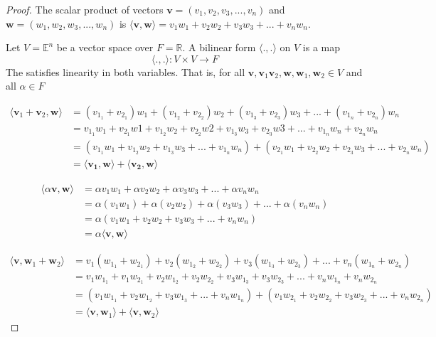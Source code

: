 \documentclass{tufte-book}
\theoremstyle{mytheoremstyle}
\theoremstyle{mylemstyle}
\theoremstyle{mydefstyle}
\begin{document}
\begin{proof}
The scalar product of vectors $\mathbf{v} = (v_1, v_2, v_3,...,v_n)$ and $\mathbf{w} = (w_1, w_2, w_3,...,w_n)$ is $\langle\mathbf{v}, \mathbf{w}\rangle = v_1w_1 + v_2w_2 + v_3w_3 +...+ v_nw_n$. 

Let $V = \mathbb{E}^n$ be a vector space over $F = \mathbb{R}$.  A bilinear form $\langle.,.\rangle$ on $V$ is a map 
\[\langle.,.\rangle : V \times V \rightarrow F \]
The satisfies linearity in both variables.  That is, for all $\mathbf{v},\mathbf{v}_1\mathbf{v}_2,\mathbf{w},\mathbf{w}_1,\mathbf{w}_2 \in V$ and all $\alpha \in F$

\begin{align*}
\langle\mathbf{v}_1+\mathbf{v}_2, \mathbf{w} \rangle &= (v_{1_{1}}+v_{2_{1}})w_1 + (v_{1_{2}}+v_{2_{2}})w_2 + (v_{1_{3}}+v_{2_{3}})w_3 +...+(v_{1_{n}}+v_{2_{n}})w_n  \\
&= v_{1_{1}}w_1 + v_{2_{1}}w1 + v_{1_{2}}w_2 + v_{2_{2}}w2 + v_{1_{3}}w_3 + v_{2_{3}}w3 +...+v_{1_{n}}w_n + v_{2_{n}}w_n \\
&= (v_{1_{1}}w_1 + v_{1_{2}}w_2 + v_{1_{3}}w_3 +...+v_{1_{n}}w_n) + (v_{2_{1}}w_1 + v_{2_{2}}w_2 + v_{2_{3}}w_3 +...+v_{2_{n}}w_n)\\
&= \langle\mathbf{v_1},\mathbf{w} \rangle + \langle\mathbf{v_2},\mathbf{w} \rangle
\end{align*}

\begin{align*}
\langle \alpha \mathbf{v},\mathbf{w} \rangle &= \alpha v_1 w_1 + \alpha v_2 w_2 + \alpha v_3 w_3 +...+ \alpha v_n w_n \\
&= \alpha(v_1w_1) + \alpha(v_2w_2) + \alpha(v_3w_3) +...+\alpha(v_nw_n) \\
&=\alpha (v_1w_1 + v_2w_2 + v_3w_3 +...+v_nw_n) \\
&= \alpha \langle \mathbf{v}, \mathbf{w} \rangle 
\end{align*}

\begin{align*}
\langle \mathbf{v}, \mathbf{w}_1+\mathbf{w}_2 \rangle &= v_1(w_{1_{1}}+w_{2_{1}}) + v_2(w_{1_{2}}+w_{2_{2}}) + v_3(w_{1_{3}}+w_{2_{3}}) +...+v_n(w_{1_{n}}+w_{2_{n}})  \\
&= v_1w_{1_{1}} + v_1w_{2_{1}} + v_2w_{1_{2}}+ v_2w_{2_{2}} + v_3w_{1_{3}}+ v_3w_{2_{3}} +...+v_nw_{1_{n}}+ v_nw_{2_{n}}\\
&= (v_1w_{1_{1}} + v_2w_{1_{2}} + v_3w_{1_{3}} +...+v_nw_{1_{n}}) +
(v_1w_{2_{1}} + v_2w_{2_{2}} + v_3w_{2_{3}} +...+v_nw_{2_{n}}) \\
&= \langle \mathbf{v}, \mathbf{w}_1 \rangle + \langle \mathbf{v}, \mathbf{w}_2 \rangle
\end{align*}


\end{proof}
\end{document}
